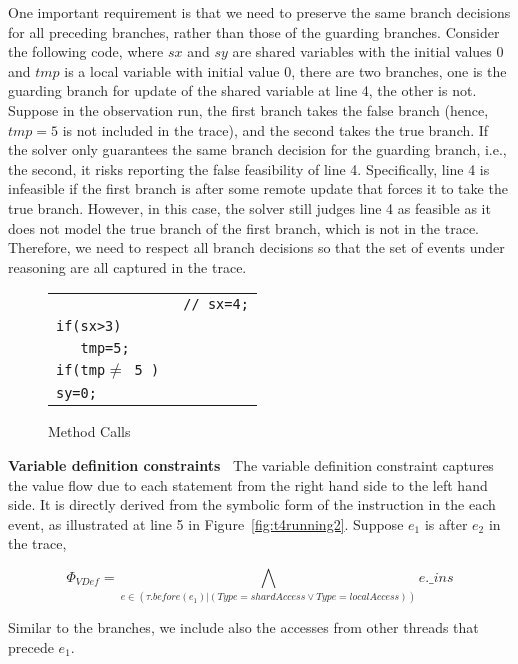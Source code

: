 One important requirement is that we need to preserve the same branch decisions for all preceding branches, rather than those of the guarding branches. 
Consider the following code, where $sx$ and $sy$ are shared variables with the initial values 0 and $tmp$ is a local variable with initial value 0, there are two branches, one is the guarding branch for update of the shared variable at line 4, the other is not. Suppose in the observation run, the first branch takes the false branch (hence, $tmp=5$ is not included in the trace), and the second takes the true branch. If the solver only guarantees the same branch decision for the guarding branch, i.e., the second, it risks reporting the false feasibility of line 4. Specifically, line 4 is infeasible if the first branch is after some remote update that forces it to take the true branch. However, in this case, the solver still judges line 4 as feasible as it does not model the true branch of the first branch, which is not in the trace. Therefore, we need to respect all branch decisions so that the 
set of events under reasoning are all captured in the trace.






 \begin{figure}
\centering
\begin{tabular}{ll}
               & {\tt // sx=4;}  \\ 
{\tt if(sx>3) } &  \\ 
 {\tt \ \ \  {tmp=5;}} &  \\
 {\tt if(tmp$\neq$ 5 ) } & \\
  {\tt {sy=0;}} & \\
\end{tabular}
\caption{Method Calls}
\label{fig:methcall}
\end{figure}





{\bf Variable definition constraints\ } The variable definition constraint captures the value flow due to each statement from the right hand side to the left hand side. It is directly derived from the symbolic form of the instruction in the each event, as illustrated at line 5 in Figure~\ref{fig:t4running2}.
Suppose $e_1$ is after $e_2$ in the trace,

 $$
\Phi_{VDef}=\bigwedge_{e\in (\tau.before(e_1)|(Type=shardAccess\vee Type=localAccess))} e.\_ins 
$$

Similar to the branches, we include also the accesses from other threads that precede $e_1$.




